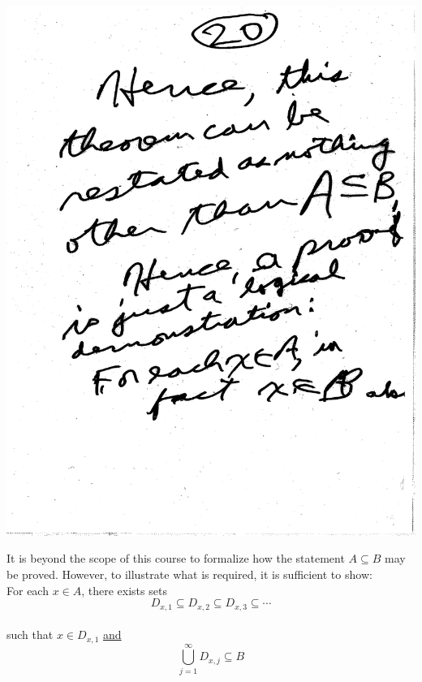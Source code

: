 \documentclass[10pt,a4paper]{article}
\begin{document}
\includegraphics[scale=.5]{Pages/ST_20}

\newpage

\noindent It is beyond the scope of this course to formalize how the statement $A \subseteq B$ may be proved. However, to illustrate what is required, it is sufficient to show:
\vspace{2mm}
\\ For each $x \in A$, there exists sets 
$$ D_{x, 1} \subseteq D_{x, 2} \subseteq D_{x, 3} \subseteq \cdots $$
\\ such that $x \in D_{x, 1}$ \underline{and}
$$ \bigcup_{j=1}^{\infty} D_{x, j} \subseteq B$$
\end{document}
